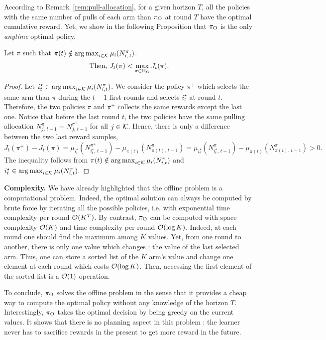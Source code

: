 According to Remark~\ref{rem:pull-allocation}, for a given horizon $T$, all the policies with the same number of pulls of each arm than $\pi_{\rm O}$ at round $T$ have the optimal cumulative reward. Yet, we show in the following Proposition that $\pi_{\rm O}$ is the only \emph{anytime} optimal policy.\\

\begin{proposition}
Let $\pi$ such that $\pi(t) \notin \operatorname*{arg\,max}_{i\in \mathcal{K}} \mu_i(N_{i,\,t}^\pi)$.
\[\text{Then, } J_t(\pi) < \max_{\pi \in \Pi_{\rm O}} J_t(\pi).\]
\end{proposition}
\begin{proof}
Let $i^\star_t \in \operatorname*{arg\,max}_{i\in \mathcal{K}} \mu_i(N_{i,t}^\pi)$. We consider the policy $\pi^+$ which selects the same arm than $\pi$ during the $t-1$ first rounds and selects $i^\star_t$ at round $t$. Therefore, the two policies $\pi$ and $\pi^+$ collects the same rewards except the last one. Notice that before the last round $t$, the two policies have the same pulling allocation $N_{j,\,t-1}^\pi = N_{j,\,t-1}^{\pi^+}$ for all $j \in \mathcal{K}$.  Hence, there is only a difference between the two last reward samples,
\[ 
J_t(\pi^+) - J_t(\pi) =  \mu_{i^\star_t}(N_{i^\star_t,\,t-1}^{\pi^+}) - \mu_{\pi(t)}(N_{\pi(t),\,t-1}^{\pi}) = \mu_{i^\star_t}(N_{i^\star_t,\,t-1}^{\pi}) - \mu_{\pi(t)}(N_{\pi(t),\,t-1}^{\pi}) > 0.
\]
%
The inequality follows from $\pi(t) \notin \operatorname*{arg\,max}_{i\in \mathcal{K}} \mu_i(N_{i,t}^\pi)$ and $i^\star_t \in \operatorname*{arg\,max}_{i\in \mathcal{K}} \mu_i(N_{i,t}^\pi)$.
\end{proof}
\begin{remark}
%
\textbf{Complexity.} We have already highlighted that the offline problem is a computational problem. Indeed, the optimal solution can always be computed by brute force by iterating all the possible policies, i.e. with exponential time complexity per round $\mathcal{O}(K^T)$. By contrast, $\pi_{\rm O}$ can be computed with space complexity $\mathcal{O}(K)$ and time complexity per round $\mathcal{O}(\log{K})$. Indeed, at each round one should find the maximum among $K$ values. Yet, from one round to another, there is only one value which changes : the value of the last selected arm. Thus, one can store a sorted list of the $K$ arm's value and change one element at each round which costs $\mathcal{O}(\log{K})$. Then, accessing the first element of the sorted list is a $\mathcal{O}(1)$ operation.
\end{remark}
%
To conclude, $\pi_{\rm O}$ solves the offline problem in the sense that it provides a cheap way to compute the optimal policy without any knowledge of the horizon $T$. Interestingly, $\pi_{\rm O}$ takes the optimal decision by being greedy on the current values. It shows that there is no planning aspect in this problem : the learner never has to sacrifice rewards in the present to get more reward in the future.
%
